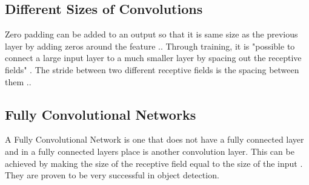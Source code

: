\subsection*{Different Sizes of Convolutions}
Zero padding can be added to an output so that it is same size as the previous layer by adding zeros around the feature \textcite{handOnML}..
Through training, it is "possible to connect a large input layer to a much smaller layer by spacing out the receptive fields" \textcite{handOnML}.
The stride between two different receptive fields is the spacing between them \textcite{handOnML}.. 

\subsection*{Fully Convolutional Networks}
A Fully Convolutional Network is one that does not have a fully connected layer
and in a fully connected layers place is another convolution layer.
This can be achieved by making the size of the receptive field equal to the size of the input \textcite{digits}.
They are proven to be very successful in object detection.